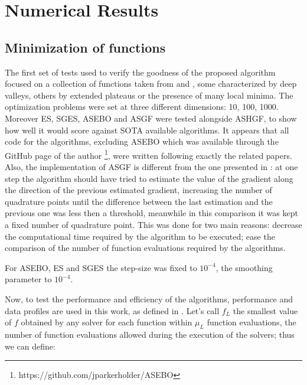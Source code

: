 
\chapter{Numerical Results}\label{chapt:4}


\section{Minimization of functions}

The first set of tests used to verify the goodness of the proposed algorithm focused on a collection of functions taken from \cite{simulationlib} and \cite{andrei2008unconstrained}, some characterized by deep valleys, others by extended plateaus or the presence of many local minima. The optimization problems were set at three different dimensions: 10, 100, 1000. Moreover ES, SGES, ASEBO and ASGF were tested alongside ASHGF, to show how well it would score against SOTA available algorithms. It appears that all code for the algorithms, excluding ASEBO which was available through the GitHub page of the author \footnote{https://github.com/jparkerholder/ASEBO}, were written following exactly the related papers. Also, the implementation of ASGF is different from the one presented in \cite{Dereventsov2020}: at one step the algorithm should have tried to estimate the value of the gradient along the direction of the previous estimated gradient, increasing the number of quadrature points until the difference between the last estimation and the previous one was less then a threshold, meanwhile in this comparison it was kept a fixed number of quadrature point. This was done for two main reasons: decrease the computational time required by the algorithm to be executed; ease the comparison of the number of function evaluations required by the algorithms.

For ASEBO, ES and SGES the step-size was fixed to $10^{-4}$, the smoothing parameter to $10^{-4}$.

Now, to test the performance and efficiency of the algorithms, performance and data profiles are used in this work, as defined in \cite{more2009benchmarking}. Let's call $f_L$ the smallest value of $f$ obtained by any solver for each function within $\mu_L$ function evaluations, the number of function evaluations allowed during the execution of the solvers; thus we can define:

